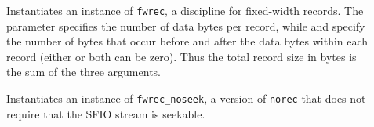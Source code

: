 \begin{description}
\item
[]
 Instantiates an instance of \texttt{fwrec}, a discipline for fixed-width
 records.  The parameter  specifies the number of data bytes per record,
 while  and  specify the number of bytes that
 occur before and after the data bytes within each record (either or
 both can be zero).  Thus the total record size in bytes is the sum
 of the three arguments.  

\item[]
Instantiates an instance of \texttt{fwrec\_noseek}, a version of \texttt{norec}
that does not require that the SFIO stream is seekable.

\end{description}
